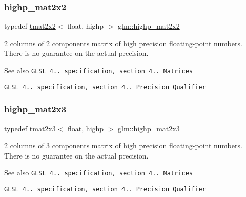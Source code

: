 \subsubsection{\texorpdfstring{highp\+\_\+mat2x2}{highp\_mat2x2}}
{\footnotesize\ttfamily typedef \hyperlink{structglm_1_1tmat2x2}{tmat2x2}$<$ float, highp $>$ \hyperlink{group__core__precision_ga20b66861ebdfa14586f4028c5ef16d2e}{glm\+::highp\+\_\+mat2x2}}

2 columns of 2 components matrix of high precision floating-\/point numbers. There is no guarantee on the actual precision.

\begin{DoxySeeAlso}{See also}
\href{http://www.opengl.org/registry/doc/GLSLangSpec.4.20.8.pdf}{\tt G\+L\+SL 4.. specification, section 4.. Matrices} 

\href{http://www.opengl.org/registry/doc/GLSLangSpec.4.20.8.pdf}{\tt G\+L\+SL 4.. specification, section 4.. Precision Qualifier} 
\end{DoxySeeAlso}
\mbox{\label{group__core__precision_ga96ec9c154598fcc1c113d9ebd3680097}} 
\subsubsection{\texorpdfstring{highp\+\_\+mat2x3}{highp\_mat2x3}}
{\footnotesize\ttfamily typedef \hyperlink{structglm_1_1tmat2x3}{tmat2x3}$<$ float, highp $>$ \hyperlink{group__core__precision_ga96ec9c154598fcc1c113d9ebd3680097}{glm\+::highp\+\_\+mat2x3}}

2 columns of 3 components matrix of high precision floating-\/point numbers. There is no guarantee on the actual precision.

\begin{DoxySeeAlso}{See also}
\href{http://www.opengl.org/registry/doc/GLSLangSpec.4.20.8.pdf}{\tt G\+L\+SL 4.. specification, section 4.. Matrices} 

\href{http://www.opengl.org/registry/doc/GLSLangSpec.4.20.8.pdf}{\tt G\+L\+SL 4.. specification, section 4.. Precision Qualifier} 
\end{DoxySeeAlso}
\mbox{\label{group__core__precision_ga74ae75c71c8c2b775714fb24454d6096}} 
